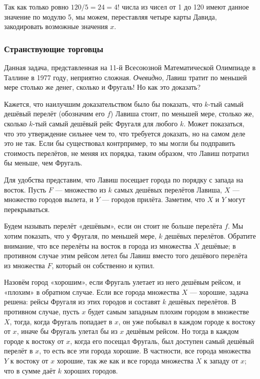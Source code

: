 Так как только ровно $120/5 = 24 = 4!$ числа из чисел от 1 до 120 имеют данное значение по модулю 5, мы можем, переставляя четыре карты Давида, закодировать возможные значения $x$.\heart

\subsubsection*{Странствующие торговцы} %

Данная задача, представленная на 11-й Всесоюзной Математической Олимпиаде в Таллине в 1977 году, неприятно %
сложная.
\emph{Очевидно}, Лавиш тратит по меньшей мере столько же денег, сколько и Фругаль!
Но как это доказать? %

Кажется, что наилучшим доказательством было бы показать, что $k$-тый самый
дешёвый перелёт (обозначим его $f$) Лавиша стоит, по меньшей мере, столько же, сколько $k$-тый самый дешёвый рейс Фругаля для любого $k$.
Может показаться, что это утверждение сильнее чем то, что требуется доказать, но на самом деле это не так.
Если бы существовал контрпример, то мы могли бы подправить стоимость перелётов, не меняя их порядка, таким образом, что Лавиш потратил бы меньше, чем Фругаль.

Для удобства представим, что Лавиш посещает города по порядку с запада на восток.
Пусть $F$ --- множество из $k$ самых дешёвых перелётов Лавиша, $X$ --- множество городов вылета, и $Y$ --- городов прилёта.
Заметим, что $X$ и $Y$ могут перекрываться.

Будем называть перелёт «дешёвым», если он стоит не больше перелёта $f$.
Мы хотим показать, что у Фругаля, по меньшей мере, $k$ дешёвых перелётов.
Обратите внимание, что все перелёты на восток в города из множества $X$ дешёвые; в противном случае этим рейсом летел бы Лавиш вместо того дешёвого перелёта из множества $F$, который он собственно и купил.

Назовём город «хорошим», если Фругаль улетает из него дешёвым рейсом, и «плохим» в обратном случае.
Если все города множества $X$ --- хорошие, задача решена: рейсы Фругаля из этих городов и составят $k$ дешёвых перелётов.
В противном случае, пусть $x$ будет самым западным плохим городом в множестве $X$, тогда, когда Фругаль попадает в $x$, он уже побывал в каждом городе к востоку от $x$, иначе бы Фругаль улетал бы из $x$ дешёвым рейсом.
Но тогда в каждом городе к востоку от $x$, когда его посещал Фругаль, был доступен самый дешёвый перелёт в $x$, то есть все эти города хорошие.
В частности, все города множества $Y$ к востоку от $x$ хорошие, так же как и все города множества $X$ к западу от $x$; что в сумме даёт $k$ хороших городов.
\heart

